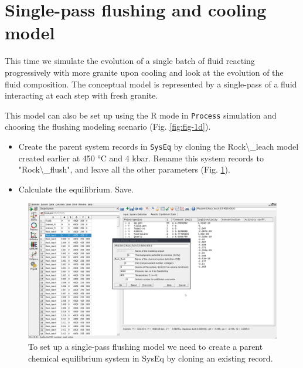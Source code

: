 \documentclass[
]{book}
\begin{document}
\hypertarget{single-pass-flushing-and-cooling-model}{%
\section{Single-pass flushing and cooling model}\label{single-pass-flushing-and-cooling-model}}

This time we simulate the evolution of a single batch of fluid reacting progressively with more granite upon cooling and look at the evolution of the fluid composition. The conceptual model is represented by a single-pass of a fluid interacting at each step with fresh granite.

This model can also be set up using the R mode in \texttt{Process} simulation and choosing the flushing modeling scenario (Fig. \ref{fig:fig-1d}).

\begin{itemize}
\item
  Create the parent system records in \texttt{SysEq} by cloning the Rock\textbackslash\_leach model created earlier at 450 °C and 4 kbar. Rename this system records to "Rock\textbackslash\_flush", and leave all the other parameters (Fig. \ref{fig:fig-14d}).
\item
  Calculate the equilibrium. Save.
\end{itemize}

\begin{figure}
\includegraphics[width=1\linewidth]{figures/module4/fig-14} \caption{To set up a single-pass flushing model we need to create a parent chemical equilibrium system in SysEq by cloning an existing record.}\label{fig:fig-14d}
\end{figure}
\end{document}
